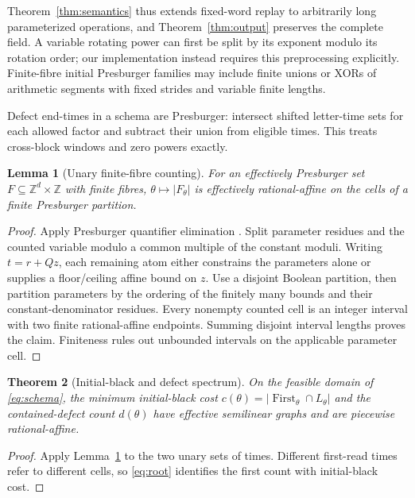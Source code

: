 \documentclass[11pt]{article}
\newtheorem{theorem}{Theorem}[section]
\newtheorem{lemma}[theorem]{Lemma}
\theoremstyle{remark}\newtheorem{remark}[theorem]{Remark}
\newcommand{\Z}{\mathbb Z}\newcommand{\N}{\mathbb N}
\begin{document}
Theorem~\ref{thm:semantics} thus extends fixed-word replay to arbitrarily long
parameterized operations, and Theorem~\ref{thm:output} preserves the complete
field. A variable rotating power can first be split by its exponent modulo
its rotation order; our implementation instead requires this preprocessing
explicitly. Finite-fibre initial Presburger families may include finite unions
or XORs of arithmetic segments with fixed strides and variable finite lengths.

Defect end-times in a schema are Presburger: intersect shifted letter-time
sets for each allowed factor and subtract their union from eligible times.
This treats cross-block windows and zero powers exactly.

\begin{lemma}[Unary finite-fibre counting]\label{lem:count}
For an effectively Presburger set $F\subseteq\Z^d\times\Z$ with finite fibres,
$\theta\mapsto |F_\theta|$ is effectively rational-affine on the cells of a
finite Presburger partition.
\end{lemma}
\begin{proof}
Apply Presburger quantifier elimination \cite{haase}. Split parameter residues
and the counted variable modulo a common multiple of the constant moduli.
Writing $t=r+Qz$, each remaining atom either constrains the parameters alone
or supplies a floor/ceiling affine bound on $z$. Use a disjoint Boolean
partition, then partition parameters by the ordering of the finitely many bounds
and their constant-denominator residues. Every nonempty counted cell is an
integer interval with two finite rational-affine endpoints. Summing disjoint
interval lengths proves the claim. Finiteness rules out unbounded intervals
on the applicable parameter cell.
\end{proof}

\begin{theorem}[Initial-black and defect spectrum]\label{thm:spectrum}
On the feasible domain of \eqref{eq:schema}, the minimum initial-black cost
$c(\theta)=|\operatorname{First}_\theta\cap L_\theta|$ and the contained-defect
count $d(\theta)$ have effective semilinear graphs and are piecewise
rational-affine.
\end{theorem}
\begin{proof}
Apply Lemma~\ref{lem:count} to the two unary sets of times. Different first-read
times refer to different cells, so \eqref{eq:root} identifies the first count
with initial-black cost.
\end{proof}
\end{document}
